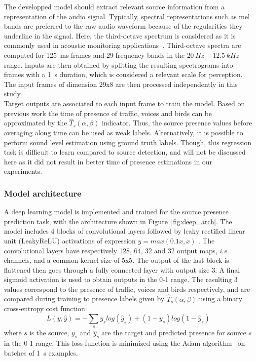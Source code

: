 \documentclass[11pt,a4paper]{article}
\begin{document}
The developped model should extract relevant source information from a representation of the audio signal. Typically, spectral representations such as mel bands are preferred to the raw audio waveform because of the regularities they underline in the signal. Here, the third-octave spectrum is considered as it is commonly used in acoustic monitoring applications~\cite{ardouin2018, gontier2017}. Third-octave spectra are computed for 125~ms frames and 29 frequency bands in the $20~Hz - 12.5~kHz$ range. Inputs are then obtained by splitting the resulting spectrograms into frames with a 1~s duration, which is considered a relevant scale for perception. The input frames of dimension 29x8 are then processed independently in this study.\\

Target outputs are associated to each input frame to train the model. Based on previous work the time of presence of traffic, voices and birds can be approximated by the $\hat T_s(\alpha, \beta)$ indicator. Thus, the source presence values before averaging along time can be used as weak labels. Alternatively, it is possible to perform sound level estimation using ground truth labels. Though, this regression task is difficult to learn compared to source detection, and will not be discussed here as it did not result in better time of presence estimations in our experiments.

\subsubsection{Model architecture}
\label{sec:deep_mdl}

A deep learning model is implemented and trained for the source presence prediction task, with the architecture shown in Figure~\ref{fig:deep_arch}. The model includes 4 blocks of convolutional layers followed by leaky rectified linear unit (LeakyReLU) activations of expression $y = max(0.1x, x)$ . The convolutional layers have respectively 128, 64, 32 and 32 output maps, \textit{i.e.} channels, and a common kernel size of 5x5. The output of the last block is flattened then goes through a fully connected layer with output size 3. A final sigmoid activation is used to obtain outputs in the 0-1 range. The resulting 3 values correspond to the presence of traffic, voices and birds respectively, and are compared during training to presence labels given by $\hat T_s(\alpha, \beta)$ using a binary cross-entropy cost function:
\begin{equation}
L(y, \hat y) = -\sum_s y_s log\left(\hat y_s\right) + (1-y_s) log\left(1-\hat y_s\right)
\end{equation}
where $s$ is the source, $y_s$ and $\hat y_s$ are the target and predicted presence for source $s$ in the 0-1 range. This loss function is minimized using the Adam algorithm~\cite{kingma2015} on batches of 1~s examples.\\
\end{document}
